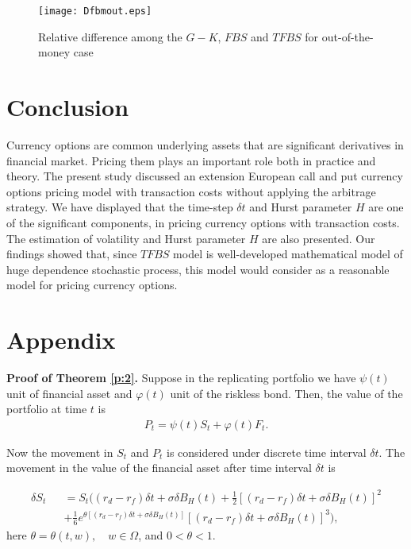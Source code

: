 \documentclass[a4paper,11pt]{amsart}
\numberwithin{equation}{section}
\theoremstyle{definition}
\theoremstyle{plain}
\theoremstyle{definition}
\newcommand{\1}{\mathbf{1}}
\begin{document}
\begin{figure}[H]
  \centering
          \texttt{[image: Dfbmout.eps]}

  \caption{Relative difference among the $G-K$, $FBS$ and $TFBS$ for out-of-the-money case}
\label{fig:4}
\end{figure}


\section{Conclusion}\label{sec:5}
Currency options are common underlying assets that are significant derivatives in financial market. Pricing them plays an important role both in practice and theory. The present study discussed an extension European call and put currency options pricing model with transaction costs without applying the arbitrage strategy. We have displayed that the time-step $ \delta t$ and Hurst parameter $H$ are one of the significant components, in pricing currency options  with transaction costs. The estimation of volatility and Hurst parameter $H$ are also presented. Our findings showed that, since $TFBS$ model is well-developed mathematical model of huge dependence stochastic process, this model would consider as a reasonable model for pricing currency options.\\

\section*{Appendix}\label{appendix}


\textbf{Proof of Theorem \ref{p:2}.} Suppose in the replicating portfolio we have $\psi(t)$ unit of financial asset and $\varphi(t)$ unit of the riskless bond. Then, the value of the portfolio at time $t$ is
\begin{eqnarray}
P_t=\psi(t)S_t+\varphi(t)F_t.
\label{eq:27}
\end{eqnarray}

Now the movement in $S_t$ and $P_t$ is considered under discrete time interval $\delta t$. The movement in the value of the financial asset after time interval $\delta t$ is

\begin{eqnarray}
\delta S_t&&=S_t((r_d-r_f)\delta t+\sigma\delta B_H(t)+\frac{1}{2}[(r_d-r_f)\delta t+\sigma\delta B_H(t)]^2 \nonumber \\
&&+\frac{1}{6}e^{\theta[(r_d-r_f)\delta t+\sigma\delta B_H(t)]}[(r_d-r_f)\delta t+\sigma\delta B_H(t)]^3),
\label{eq:28}
\end{eqnarray}
here $\theta=\theta(t,w),\quad w\in\Omega$, and $0<\theta<1$.
\end{document}
